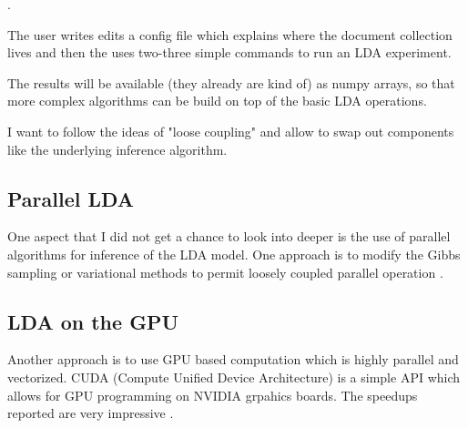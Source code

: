 \documentclass[letterpaper,12pt]{article}
\begin{document}
		\cite{IvanCode}.
		
	    
	    The user writes edits a config file which explains where the document collection lives
	    and then the uses two-three simple commands to run an LDA experiment.

	    The results will be available (they already are kind of) as numpy arrays, so that
	    more complex algorithms can be build on top of the basic LDA operations.

	    I want to follow the ideas of "loose coupling" and allow to swap out components like
	    the underlying inference algorithm.


	
				\vspace{3in}
				
						\vspace{3in}
						
						
		
		
	\subsection{Parallel LDA}

	        One aspect that I did not get a chance to look into deeper is the use of parallel algorithms
	        for inference of the LDA model.
	        One approach is to modify the Gibbs sampling or variational methods to permit loosely
	        coupled parallel operation \cite{newman2006scalable,newman2007distributed}. 
	        
	        		\vspace{3in}
					\vspace{3in}
					

	\subsection{LDA on the GPU}
		
	        Another approach is to use GPU based computation which is highly parallel and vectorized.
	        CUDA (Compute Unified Device Architecture) is a simple API which allows for GPU programming
	        on NVIDIA grpahics boards. The speedups reported are very impressive
	        \cite{masada2009accelerating, yan-parallel}.


				\vspace{3in}
						\vspace{3in}
						
\end{document}
